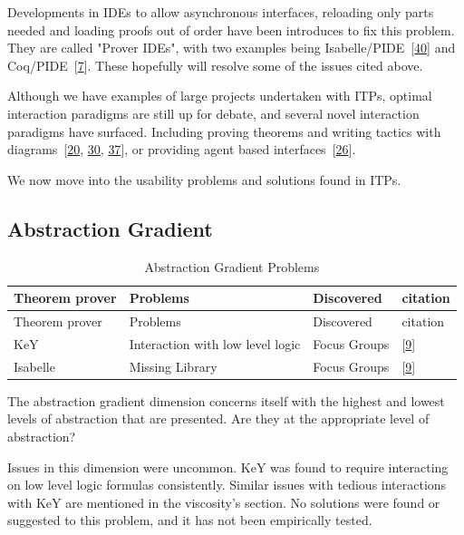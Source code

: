 \documentclass[
]{article}
\begin{document}
Developments in IDEs to allow asynchronous interfaces, reloading only
parts needed and loading proofs out of order have been introduces to fix
this problem. They are called "Prover IDEs", with two examples being
Isabelle/PIDE~{[}\protect\hyperlink{ref-wenzel_asynchronous_2014}{40}{]}
and Coq/PIDE~{[}\protect\hyperlink{ref-barras_asynchronous_2015}{7}{]}.
These hopefully will resolve some of the issues cited above.

Although we have examples of large projects undertaken with ITPs,
optimal interaction paradigms are still up for debate, and several novel
interaction paradigms have surfaced. Including proving theorems and
writing tactics with
diagrams~{[}\protect\hyperlink{ref-grov_tinker_2018}{20},
\protect\hyperlink{ref-lin_understanding_2016}{30},
\protect\hyperlink{ref-shams_accessible_2018}{37}{]}, or providing agent
based
interfaces~{[}\protect\hyperlink{ref-hunter_agent-based_2005}{26}{]}.

We now move into the usability problems and solutions found in ITPs.

\hypertarget{abstraction-gradient-1}{%
\subsection{Abstraction Gradient}\label{abstraction-gradient-1}}

\hypertarget{tbl:abstraction_gradient}{}
\begin{longtable}[]{@{}llll@{}}
\caption{\label{tbl:abstraction_gradient}Abstraction Gradient
Problems}\tabularnewline
\toprule
Theorem prover & Problems & Discovered & citation \\
\midrule
\endfirsthead
\toprule
Theorem prover & Problems & Discovered & citation \\
\midrule
\endhead
KeY & Interaction with low level logic & Focus Groups &
{[}\protect\hyperlink{ref-beckert_usability_2015}{9}{]} \\
Isabelle & Missing Library & Focus Groups &
{[}\protect\hyperlink{ref-beckert_usability_2015}{9}{]} \\
\bottomrule
\end{longtable}

The abstraction gradient dimension concerns itself with the highest and
lowest levels of abstraction that are presented. Are they at the
appropriate level of abstraction?

Issues in this dimension were uncommon. KeY was found to require
interacting on low level logic formulas consistently. Similar issues
with tedious interactions with KeY are mentioned in the viscosity's
section. No solutions were found or suggested to this problem, and it
has not been empirically tested.
\end{document}

